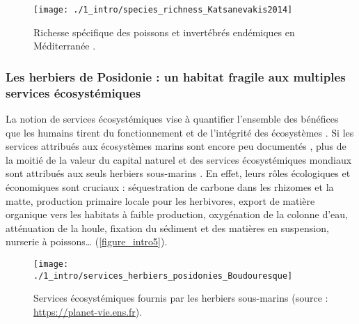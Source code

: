 \begin{figure}[H]
	\begin{center}
	\texttt{[image: ./1\_intro/species\_richness\_Katsanevakis2014]}
		\caption[Richesse spécifique des poissons et invertébrés endémiques en Méditerranée]{Richesse spécifique des poissons et invertébrés endémiques en Méditerranée \citep{katsanevakis_invading_2014}.}
	\label{figure_intro4}
\end{center}
\end{figure}

\subsubsection{Les herbiers de Posidonie : un habitat fragile aux multiples services écosystémiques}\label{intro.1.3.1}

La notion de services écosystémiques vise à quantifier l’ensemble des bénéfices que les humains tirent du fonctionnement et de l’intégrité des écosystèmes \citep{de_groot_global_2012}. Si les services attribués aux écosystèmes marins sont encore peu documentés \citep{townsend_challenge_2018}, plus de la moitié de la valeur du capital naturel et des services écosystémiques mondiaux sont attribués aux seuls herbiers sous-marins \citep{millenium_ecosystem_assessment_ecosystem_2005, ipbes_global_2019}. En effet, leurs rôles écologiques et économiques sont cruciaux : séquestration de carbone dans les rhizomes et la matte, production primaire locale pour les herbivores, export de matière organique vers les habitats à faible production, oxygénation de la colonne d’eau, atténuation de la houle, fixation du sédiment et des matières en suspension, nurserie à poissons… (\autoref{figure_intro5}).

\begin{figure}[H]
	\begin{center}
	\texttt{[image: ./1\_intro/services\_herbiers\_posidonies\_Boudouresque]}
		\caption[Services écosystémiques fournis par les herbiers sous-marins]{Services écosystémiques fournis par les herbiers sous-marins (source : \href{https://planet-vie.ens.fr}{https://planet-vie.ens.fr}).}
	\label{figure_intro5}
\end{center}
\end{figure}

